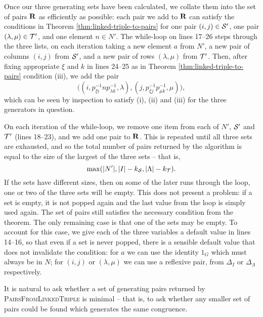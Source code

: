 Once our three generating sets have been calculated, we collate them into the
set of pairs $\mathbf{R}$ as efficiently as possible: each pair we add to $\mathbf{R}$ can
satisfy the conditions in Theorem \ref{thm:linked-triple-to-pairs} for one pair
$(i,j) \in \mathcal{S}'$, one pair $(\lambda, \mu) \in \mathcal{T}'$, and one element
$n \in N'$.  The while-loop on lines 17--26 steps through the three lists, on
each iteration taking a new element $a$ from $N'$, a new pair of columns $(i,j)$
from $\mathcal{S}'$, and a new pair of rows $(\lambda, \mu)$ from $\mathcal{T}'$.  Then, after
fixing appropriate $\xi$ and $k$ in lines 24--25 as in Theorem
\ref{thm:linked-triple-to-pairs} condition (iii), we add the pair
$$\big((i, p_{\xi i}^{-1}np_{\lambda k}^{-1}, \lambda),
(j, p_{\xi j}^{-1}p_{\mu k}^{-1}, \mu)\big),$$
which can be seen by inspection to satisfy (i), (ii) and (iii) for the three
generators in question.

On each iteration of the while-loop, we remove one item from each of $N'$,
$\mathcal{S}'$ and $\mathcal{T}'$ (lines 18--23), and we add one pair to $\mathbf{R}$.
This is repeated until all three sets are
exhausted, and so the total number of pairs returned by the algorithm is equal
to the size of the largest of the three sets -- that is,
$$\max(|N'|, |I| - k_{\mathcal{S}}, |\Lambda| - k_{\mathcal{T}}).$$
If the sets have different sizes, then on some of the later runs through the
loop, one or two of the three sets will be empty.  This does not present a
problem: if a set is empty, it is not popped again and the last value from the
loop is simply used again.  The set of pairs still satisfies the necessary
condition from the theorem.  The only remaining case is that one of the sets may
be empty.  To account for this case, we give each of the three variables a
default value in lines 14--16, so that even if a set is never popped, there is a
sensible default value that does not invalidate the condition: for $a$ we can use the identity
$1_G$ which must always be in $N$; for $(i,j)$ or $(\lambda,\mu)$ we can use a
reflexive pair, from $\Delta_I$ or $\Delta_\Lambda$ respectively.

It is natural to ask whether a set of generating pairs returned by
\textsc{PairsFromLinkedTriple} is minimal -- that is, to ask whether
any smaller set of pairs could be found which generates the same congruence.

